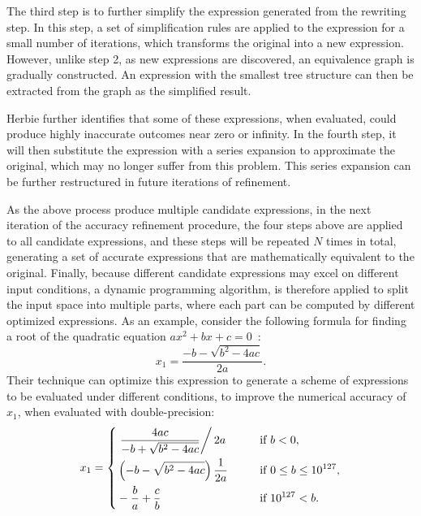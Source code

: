 The third step is to further simplify the expression generated from the
rewriting step.  In this step, a set of simplification rules are applied to the
expression for a small number of iterations, which transforms the original into
a new expression.  However, unlike step 2, as new expressions are discovered,
an equivalence graph is gradually constructed.  An expression with the smallest
tree structure can then be extracted from the graph as the simplified result.

Herbie further identifies that some of these expressions, when evaluated, could
produce highly inaccurate outcomes near zero or infinity.  In the fourth step,
it will then substitute the expression with a series expansion to approximate
the original, which may no longer suffer from this problem.  This series
expansion can be further restructured in future iterations of refinement.

As the above process produce multiple candidate expressions, in the next
iteration of the accuracy refinement procedure, the four steps above are
applied to all candidate expressions, and these steps will be repeated
$N$ times in total, generating a set of accurate expressions that are
mathematically equivalent to the original.  Finally, because different
candidate expressions may excel on different input conditions, a dynamic
programming algorithm, is therefore applied to split the input space into
multiple parts, where each part can be computed by different optimized
expressions.  As an example, consider the following formula for finding a root
of the quadratic equation $ax^2 + bx + c = 0$~\cite{panchekha15}:
\begin{equation}
    x_1 = \frac{-b - \sqrt{b^2 - 4ac}}{2a}.
\end{equation}
Their technique can optimize this expression to generate a scheme of
expressions to be evaluated under different conditions, to improve the
numerical accuracy of $x_1$, when evaluated with double-precision:
\begin{equation}
    x_1 = \left\{ \begin{aligned}
            & \left. \frac{4ac}{-b + \sqrt{b^2 - 4ac}} \right/ {2a} \qquad
                && \text{if~} b < 0, \\
            & \left( -b - \sqrt{b^2 - 4ac} \right) \frac{1}{2a}
                && \text{if~} 0 \leq b \leq 10^{127}, \\
            & - \frac{b}{a} + \frac{c}{b}
                && \text{if~} 10^{127} < b.
    \end{aligned} \right.
\end{equation}

